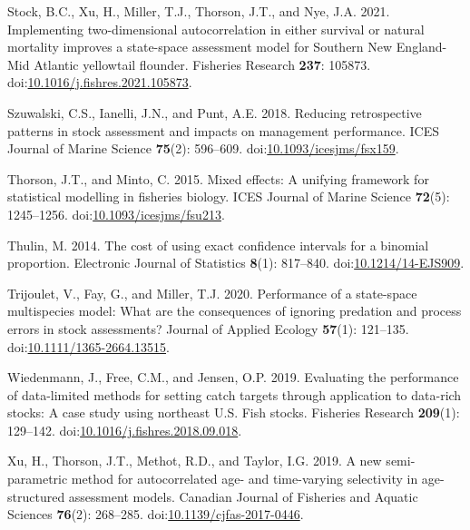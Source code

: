 \documentclass[
  12pt,
]{article}
\newlength{\cslhangindent}
\newlength{\cslentryspacingunit} %
\newenvironment{CSLReferences}[2] %
 {%
  \setlength{\parindent}{0pt}
  \ifodd #1
  \let\oldpar\par
  \def\par{\hangindent=\cslhangindent\oldpar}
  \fi
  \setlength{\parskip}{#2\cslentryspacingunit}
 }%
 {}
\begin{document}
\begin{CSLReferences}{1}{0}
\leavevmode{}%
Stock, B.C., Xu, H., Miller, T.J., Thorson, J.T., and Nye, J.A. 2021.
{Implementing two-dimensional autocorrelation in either survival or
natural mortality improves a state-space assessment model for Southern
{N}ew {E}ngland-Mid {A}tlantic yellowtail flounder}. Fisheries Research
\textbf{237}: 105873.
doi:\href{https://doi.org/10.1016/j.fishres.2021.105873}{10.1016/j.fishres.2021.105873}.

\leavevmode{}%
Szuwalski, C.S., Ianelli, J.N., and Punt, A.E. 2018. Reducing
retrospective patterns in stock assessment and impacts on management
performance. ICES Journal of Marine Science \textbf{75}(2): 596--609.
doi:\href{https://doi.org/10.1093/icesjms/fsx159}{10.1093/icesjms/fsx159}.

\leavevmode{}%
Thorson, J.T., and Minto, C. 2015. Mixed effects: A unifying framework
for statistical modelling in fisheries biology. ICES Journal of Marine
Science \textbf{72}(5): 1245--1256.
doi:\href{https://doi.org/10.1093/icesjms/fsu213}{10.1093/icesjms/fsu213}.

\leavevmode{}%
Thulin, M. 2014. {The cost of using exact confidence intervals for a
binomial proportion}. Electronic Journal of Statistics \textbf{8}(1):
817--840.
doi:\href{https://doi.org/10.1214/14-EJS909}{10.1214/14-EJS909}.

\leavevmode{}%
Trijoulet, V., Fay, G., and Miller, T.J. 2020. Performance of a
state-space multispecies model: What are the consequences of ignoring
predation and process errors in stock assessments? Journal of Applied
Ecology \textbf{57}(1): 121--135.
doi:\href{https://doi.org/10.1111/1365-2664.13515}{10.1111/1365-2664.13515}.

\leavevmode{}%
Wiedenmann, J., Free, C.M., and Jensen, O.P. 2019. Evaluating the
performance of data-limited methods for setting catch targets through
application to data-rich stocks: A case study using northeast {U.S.}
Fish stocks. Fisheries Research \textbf{209}(1): 129--142.
doi:\href{https://doi.org/10.1016/j.fishres.2018.09.018}{10.1016/j.fishres.2018.09.018}.

\leavevmode{}%
Xu, H., Thorson, J.T., Methot, R.D., and Taylor, I.G. 2019. A new
semi-parametric method for autocorrelated age- and time-varying
selectivity in age-structured assessment models. Canadian Journal of
Fisheries and Aquatic Sciences \textbf{76}(2): 268--285.
doi:\href{https://doi.org/10.1139/cjfas-2017-0446}{10.1139/cjfas-2017-0446}.

\end{CSLReferences}
\end{document}
